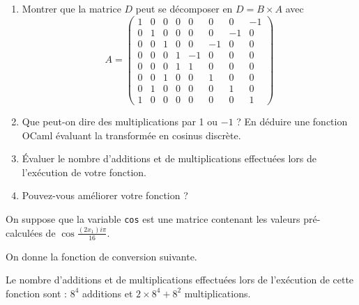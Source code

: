 \Q
\begin{enumerate}
    \item Montrer que la matrice $D$ peut se décomposer en $D = B \times A$ avec
    \[
        A=\begin{pmatrix}
            1 & 0 & 0 & 0 & 0 & 0 & 0 & -1 \\
            0 & 1 & 0 & 0 & 0 & 0 & -1 & 0 \\
            0 & 0 & 1 & 0 & 0 & -1 & 0 & 0 \\
            0 & 0 & 0 & 1 & -1 & 0 & 0 & 0 \\
            0 & 0 & 0 & 1 & 1 & 0 & 0 & 0 \\
            0 & 0 & 1 & 0 & 0 & 1 & 0 & 0 \\
            0 & 1 & 0 & 0 & 0 & 0 & 1 & 0 \\
            1 & 0 & 0 & 0 & 0 & 0 & 0 & 1
        \end{pmatrix}
    \]
    \item Que peut-on dire des multiplications par 1 ou $-1$ ? En déduire une fonction OCaml évaluant la transformée en cosinus discrète.
    \item Évaluer le nombre d'additions et de multiplications effectuées lors de l'exécution de votre fonction.
    \item Pouvez-vous améliorer votre fonction ?
\end{enumerate}

\Corrige

\Q
On suppose que la variable \texttt{cos} est une matrice contenant les valeurs pré-calculées de $\cos\frac{(2x_1)i\pi}{16}$.
\medskip

On donne la fonction de conversion  suivante.



Le nombre d'additions et de multiplications effectuées lors de l'exécution de cette fonction sont : $8^4$ additions et $2\times8^4+8^2$ multiplications.

